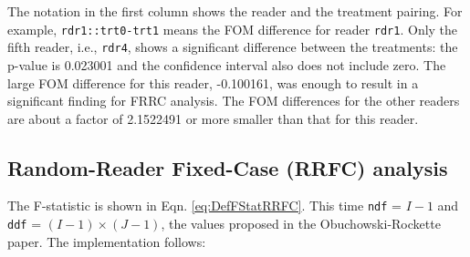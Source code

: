 \documentclass[
]{book}
\newenvironment{Shaded}{\begin{snugshade}}{\end{snugshade}}
\newcommand{\CommentTok}[1]{\textcolor[rgb]{0.56,0.35,0.01}{\textit{#1}}}
\newcommand{\DataTypeTok}[1]{\textcolor[rgb]{0.13,0.29,0.53}{#1}}
\newcommand{\DecValTok}[1]{\textcolor[rgb]{0.00,0.00,0.81}{#1}}
\newcommand{\KeywordTok}[1]{\textcolor[rgb]{0.13,0.29,0.53}{\textbf{#1}}}
\newcommand{\NormalTok}[1]{#1}
\newcommand{\OperatorTok}[1]{\textcolor[rgb]{0.81,0.36,0.00}{\textbf{#1}}}
\newcommand{\OtherTok}[1]{\textcolor[rgb]{0.56,0.35,0.01}{#1}}
\newcommand{\StringTok}[1]{\textcolor[rgb]{0.31,0.60,0.02}{#1}}
\begin{document}
The notation in the first column shows the reader and the treatment pairing. For example, \texttt{rdr1::trt0-trt1} means the FOM difference for reader \texttt{rdr1}. Only the fifth reader, i.e., \texttt{rdr4}, shows a significant difference between the treatments: the p-value is 0.023001 and the confidence interval also does not include zero. The large FOM difference for this reader, -0.100161, was enough to result in a significant finding for FRRC analysis. The FOM differences for the other readers are about a factor of 2.1522491 or more smaller than that for this reader.

\hypertarget{or-applications-RRFC-dataset02-hand}{%
\subsection{Random-Reader Fixed-Case (RRFC) analysis}\label{or-applications-RRFC-dataset02-hand}}

The F-statistic is shown in Eqn. \eqref{eq:DefFStatRRFC}. This time \texttt{ndf} = \(I-1\) and \texttt{ddf} = \((I-1) \times (J-1)\), the values proposed in the Obuchowski-Rockette paper. The implementation follows:

\begin{Shaded}
\end{Shaded}
\end{document}
